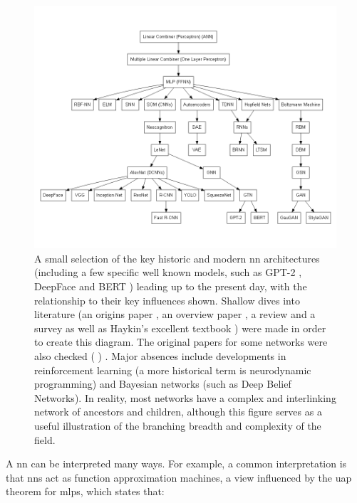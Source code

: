 \begin{figure}[H]
    \centering
    \includegraphics[width=140mm,scale=1.5]{figs/nn_architectures.png}
    \caption[Neural network architectures.]{A small selection of the key historic and modern \gls{nn} architectures (including a few specific well known models, such as GPT-2 \cite{gpt2}, DeepFace \cite{deep_face} and BERT \cite{bert}) leading up to the present day, with the relationship to their key influences shown. Shallow dives into literature (an origins paper \cite{dl_origin}, an overview paper \cite{dl_overview}, a review \cite{gnn_review} and a survey \cite{elm_survey} as well as Haykin's excellent textbook \cite{haykin}) were made in order to create this diagram. The original papers for some networks were also checked (\cite{gaugan} \cite{bdnn} \cite{lstm} \cite{bdnn} \cite{backprop_rumelhart})  \cite{gpt2} \cite{hopfieldnetworks} \cite{yolo}. Major absences include developments in reinforcement learning (a more historical term is neurodynamic programming) and Bayesian networks (such as Deep Belief Networks). In reality, most networks have a complex and interlinking network of ancestors and children, although this figure serves as a useful illustration of the branching breadth and complexity of the field.}
    \label{fig:nn_architectures}
\end{figure}

A \gls{nn} can be interpreted many ways. For example, a common interpretation is that \gls{nn}s act as function approximation machines, a view influenced by the \gls{uap} theorem for \gls{mlp}s, which states that:

